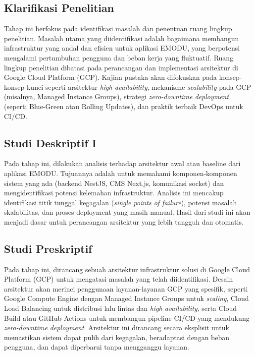 \subsection{Klarifikasi Penelitian}
Tahap ini berfokus pada identifikasi masalah dan penentuan ruang lingkup penelitian.
Masalah utama yang diidentifikasi adalah bagaimana membangun infrastruktur yang andal dan efisien untuk aplikasi EMODU, yang berpotensi mengalami pertumbuhan pengguna dan beban kerja yang fluktuatif.
Ruang lingkup penelitian dibatasi pada perancangan dan implementasi arsitektur di Google Cloud Platform (GCP).
Kajian pustaka akan difokuskan pada konsep-konsep kunci seperti arsitektur \textit{high availability}, mekanisme \textit{scalability} pada GCP (misalnya, Managed Instance Groups), strategi \textit{zero-downtime deployment} (seperti Blue-Green atau Rolling Updates), dan praktik terbaik DevOps untuk CI/CD.

\subsection{Studi Deskriptif I}
Pada tahap ini, dilakukan analisis terhadap arsitektur awal atau baseline dari aplikasi EMODU.
Tujuannya adalah untuk memahami komponen-komponen sistem yang ada (backend NestJS, CMS Next.js, komunikasi socket) dan mengidentifikasi potensi kelemahan infrastruktur.
Analisis ini mencakup identifikasi titik tunggal kegagalan (\textit{single points of failure}), potensi masalah skalabilitas, dan proses deployment yang masih manual.
Hasil dari studi ini akan menjadi dasar untuk perancangan arsitektur yang lebih tangguh dan otomatis.

\subsection{Studi Preskriptif}
Pada tahap ini, dirancang sebuah arsitektur infrastruktur solusi di Google Cloud Platform (GCP) untuk mengatasi masalah yang telah diidentifikasi.
Desain arsitektur akan merinci penggunaan layanan-layanan GCP yang spesifik, seperti Google Compute Engine dengan Managed Instance Groups untuk \textit{scaling}, Cloud Load Balancing untuk distribusi lalu lintas dan \textit{high availability}, serta Cloud Build atau GitHub Actions untuk membangun pipeline CI/CD yang mendukung \textit{zero-downtime deployment}.
Arsitektur ini dirancang secara eksplisit untuk memastikan sistem dapat pulih dari kegagalan, beradaptasi dengan beban pengguna, dan dapat diperbarui tanpa mengganggu layanan.

